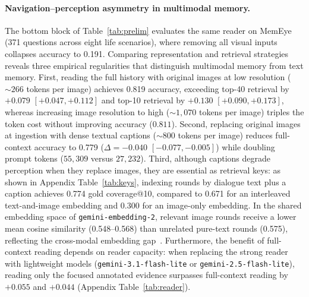\documentclass[10pt]{article}
\begin{document}
\paragraph{Navigation--perception asymmetry in multimodal memory.} The bottom block of Table~\ref{tab:prelim} evaluates the same reader on MemEye~\citep{guo2026memeye} (371 questions across eight life scenarios), where removing all visual inputs collapses accuracy to 0.191. Comparing representation and retrieval strategies reveals three empirical regularities that distinguish multimodal memory from text memory. First, reading the full history with original images at low resolution ($\sim 266$ tokens per image) achieves 0.819 accuracy, exceeding top-40 retrieval by $+0.079$ $[+0.047, +0.112]$ and top-10 retrieval by $+0.130$ $[+0.090, +0.173]$, whereas increasing image resolution to high ($\sim 1,070$ tokens per image) triples the token cost without improving accuracy ($0.811$). Second, replacing original images at ingestion with dense textual captions ($\sim 800$ tokens per image) reduces full-context accuracy to 0.779 ($\Delta = -0.040$ $[-0.077, -0.005]$) while doubling prompt tokens ($55,309$ versus $27,232$). Third, although captions degrade perception when they replace images, they are essential as retrieval keys: as shown in Appendix Table~\ref{tab:keys}, indexing rounds by dialogue text plus a caption achieves 0.774 gold coverage@10, compared to 0.671 for an interleaved text-and-image embedding and 0.300 for an image-only embedding. In the shared embedding space of \texttt{gemini-embedding-2}, relevant image rounds receive a lower mean cosine similarity (0.548--0.568) than unrelated pure-text rounds (0.575), reflecting the cross-modal embedding gap~\citep{liang2022modalitygap}. Furthermore, the benefit of full-context reading depends on reader capacity: when replacing the strong reader with lightweight models (\texttt{gemini-3.1-flash-lite} or \texttt{gemini-2.5-flash-lite}), reading only the focused annotated evidence surpasses full-context reading by $+0.055$ and $+0.044$ (Appendix Table~\ref{tab:reader}).
\end{document}
